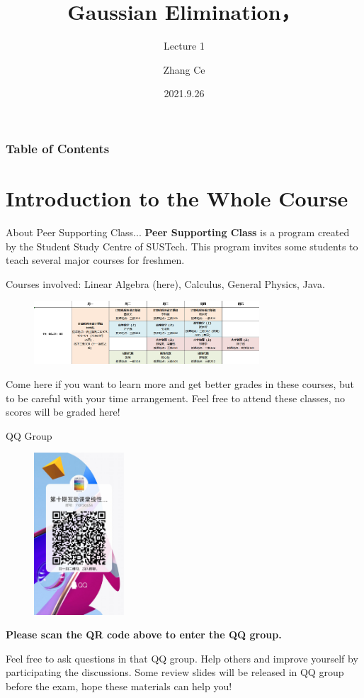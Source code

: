 \documentclass{beamer}
\title[Linear Algebra] %
{Gaussian Elimination，}
\subtitle{Lecture 1}
\author[11910803@mail.sustech.edu.cn] %
{
    Zhang Ce
}
\institute[] %
{
    Department of Electrical and Electronic Engineering\\
    Southern University of Science and Technology
}
\date[2021.9.26] %
{2021.9.26}
\begin{document}
\frame{\titlepage}


\begin{frame}
\frametitle{Table of Contents}
\tableofcontents
\end{frame}

\section{Introduction to the Whole Course}

\begin{frame}{About Peer Supporting Class...}
\textbf{Peer Supporting Class} is a program created by the Student Study Centre of SUSTech. This program invites some students to teach several major courses for freshmen.

Courses involved: Linear Algebra (here), Calculus, General Physics, Java.

\begin{figure}
    \centering
    \includegraphics[width=0.75\textwidth]{arrangement.png}
\end{figure}

Come here if you want to learn more and get better grades in these courses, but to be careful with your time arrangement. Feel free to attend these classes, no scores will be graded here!

\end{frame}

\begin{frame}{QQ Group}
\begin{figure}
    \centering
    \includegraphics[width=0.3\textwidth]{QR.jpg}
\end{figure}
\textbf{Please scan the QR code above to enter the QQ group.}

Feel free to ask questions in that QQ group. Help others and improve yourself by participating the discussions. Some review slides will be released in QQ group before the exam, hope these materials can help you!

\end{frame}
\end{document}

